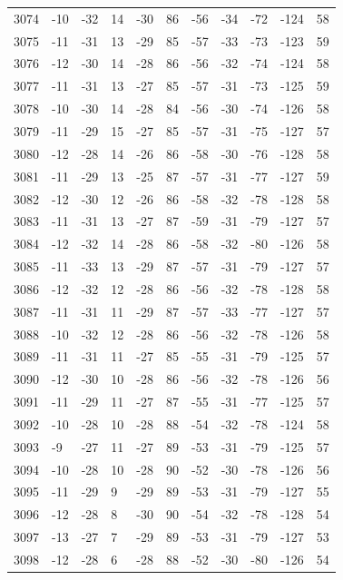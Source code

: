 \begin{table}[H]
\begin{tabular}{lllllllllll}
3074 & -10 & -32 & 14 & -30 & 86 & -56 & -34 & -72 & -124 & 58 \\
3075 & -11 & -31 & 13 & -29 & 85 & -57 & -33 & -73 & -123 & 59 \\
3076 & -12 & -30 & 14 & -28 & 86 & -56 & -32 & -74 & -124 & 58 \\
3077 & -11 & -31 & 13 & -27 & 85 & -57 & -31 & -73 & -125 & 59 \\
3078 & -10 & -30 & 14 & -28 & 84 & -56 & -30 & -74 & -126 & 58 \\
3079 & -11 & -29 & 15 & -27 & 85 & -57 & -31 & -75 & -127 & 57 \\
3080 & -12 & -28 & 14 & -26 & 86 & -58 & -30 & -76 & -128 & 58 \\
3081 & -11 & -29 & 13 & -25 & 87 & -57 & -31 & -77 & -127 & 59 \\
3082 & -12 & -30 & 12 & -26 & 86 & -58 & -32 & -78 & -128 & 58 \\
3083 & -11 & -31 & 13 & -27 & 87 & -59 & -31 & -79 & -127 & 57 \\
3084 & -12 & -32 & 14 & -28 & 86 & -58 & -32 & -80 & -126 & 58 \\
3085 & -11 & -33 & 13 & -29 & 87 & -57 & -31 & -79 & -127 & 57 \\
3086 & -12 & -32 & 12 & -28 & 86 & -56 & -32 & -78 & -128 & 58 \\
3087 & -11 & -31 & 11 & -29 & 87 & -57 & -33 & -77 & -127 & 57 \\
3088 & -10 & -32 & 12 & -28 & 86 & -56 & -32 & -78 & -126 & 58 \\
3089 & -11 & -31 & 11 & -27 & 85 & -55 & -31 & -79 & -125 & 57 \\
3090 & -12 & -30 & 10 & -28 & 86 & -56 & -32 & -78 & -126 & 56 \\
3091 & -11 & -29 & 11 & -27 & 87 & -55 & -31 & -77 & -125 & 57 \\
3092 & -10 & -28 & 10 & -28 & 88 & -54 & -32 & -78 & -124 & 58 \\
3093 & -9 & -27 & 11 & -27 & 89 & -53 & -31 & -79 & -125 & 57 \\
3094 & -10 & -28 & 10 & -28 & 90 & -52 & -30 & -78 & -126 & 56 \\
3095 & -11 & -29 & 9 & -29 & 89 & -53 & -31 & -79 & -127 & 55 \\
3096 & -12 & -28 & 8 & -30 & 90 & -54 & -32 & -78 & -128 & 54 \\
3097 & -13 & -27 & 7 & -29 & 89 & -53 & -31 & -79 & -127 & 53 \\
3098 & -12 & -28 & 6 & -28 & 88 & -52 & -30 & -80 & -126 & 54 \\

\end{tabular}
\end{table}
